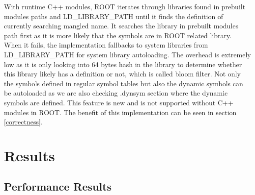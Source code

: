 \documentclass{webofc}
\begin{document}
With runtime C++ modules, ROOT iterates through libraries found in prebuilt modules paths and LD\_LIBRARY\_PATH until it finds the definition of currently searching mangled name. It searches the library in prebuilt modules path first as it is more likely that the symbols are in ROOT related library. When it fails, the implementation fallbacks to system libraries from LD\_LIBRARY\_PATH for system library autoloading. The overhead is extremely low as it is only looking into 64 bytes hash in the library to determine whether this library likely has a definition or not, which is called bloom filter. Not only the symbols defined in regular symbol tables but also the dynamic symbols can be autoloaded as we are also checking .dynsym section where the dynamic symbols are defined. This feature is new and is not supported without C++ modules in ROOT. The benefit of this implementation can be seen in section \ref{correctness}.

\section{Results}
\label{results}

\subsection{Performance Results}
\label{performance}
\end{document}
